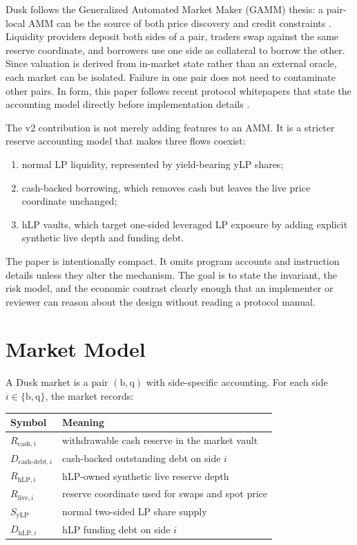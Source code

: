 \documentclass[11pt]{article}
\newcommand{\base}{\mathrm{b}}
\newcommand{\qasset}{\mathrm{q}}
\newcommand{\cash}{\mathrm{cash}}
\newcommand{\live}{\mathrm{live}}
\newcommand{\hlp}{\mathrm{hLP}}
\newcommand{\ylp}{\mathrm{yLP}}
\newcommand{\debt}{\mathrm{debt}}
\begin{document}
Dusk follows the Generalized Automated Market Maker (GAMM) thesis: a pair-local AMM can be the source of both price discovery and credit constraints \cite{omnipair-docs-intro,omnipair-docs-gamm}. Liquidity providers deposit both sides of a pair, traders swap against the same reserve coordinate, and borrowers use one side as collateral to borrow the other. Since valuation is derived from in-market state rather than an external oracle, each market can be isolated. Failure in one pair does not need to contaminate other pairs. In form, this paper follows recent protocol whitepapers that state the accounting model directly before implementation details \cite{morpho-midnight}.

The v2 contribution is not merely adding features to an AMM. It is a stricter reserve accounting model that makes three flows coexist:
\begin{enumerate}
  \item normal LP liquidity, represented by yield-bearing yLP shares;
  \item cash-backed borrowing, which removes cash but leaves the live price coordinate unchanged;
  \item hLP vaults, which target one-sided leveraged LP exposure by adding explicit synthetic live depth and funding debt.
\end{enumerate}

The paper is intentionally compact. It omits program accounts and instruction details unless they alter the mechanism. The goal is to state the invariant, the risk model, and the economic contrast clearly enough that an implementer or reviewer can reason about the design without reading a protocol manual.

\section{Market Model}

A Dusk market is a pair $(\base,\qasset)$ with side-specific accounting. For each side $i\in\{\base,\qasset\}$, the market records:

\begin{center}
\begin{tabular}{ll}
\toprule
Symbol & Meaning \\
\midrule
$R_{\cash,i}$ & withdrawable cash reserve in the market vault \\
$D_{\cash\text{-}\debt,i}$ & cash-backed outstanding debt on side $i$ \\
$R_{\hlp,i}$ & hLP-owned synthetic live reserve depth \\
$R_{\live,i}$ & reserve coordinate used for swaps and spot price \\
$S_{\ylp}$ & normal two-sided LP share supply \\
$D_{\hlp,i}$ & hLP funding debt on side $i$ \\
\bottomrule
\end{tabular}
\end{center}
\end{document}
